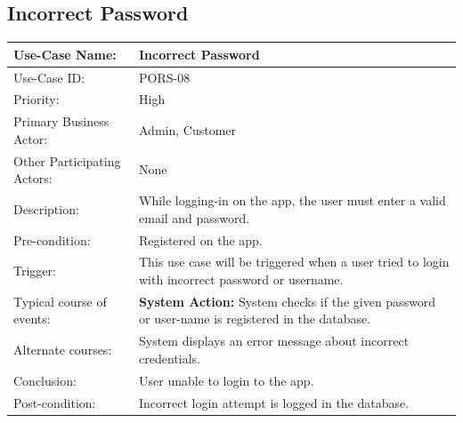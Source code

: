 \subsection{Incorrect Password}
\begin{center}
    \begin{tabular}{ @{}|p{7cm}||p{7cm}|  }
    \hline
    Use-Case Name: & Incorrect Password \\ \hline
    Use-Case ID: & PORS-08\\ \hline
    Priority: & High \\ \hline
    Primary Business Actor: & Admin, Customer \\ \hline
    Other Participating Actors: &  None \\ \hline
    Description: & While logging-in on the app, the user must enter a valid email and password.\\ \hline
    Pre-condition: & Registered on the app. \\ \hline
    Trigger: &  This use case will be triggered when a user tried to login with incorrect password or username. \\ \hline
    Typical course of events: & \textbf{System Action:} \newline System checks if the given password or user-name is registered in the database.  \\ \hline
    Alternate courses: & System displays an error message about incorrect credentials. \\ \hline
    Conclusion: & User unable to login to the app. \\ \hline
    Post-condition: & Incorrect login attempt is logged in the database. \\ \hline
    \end{tabular}
\end{center}

